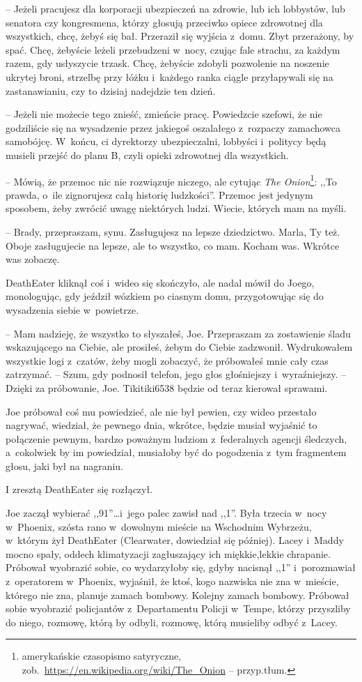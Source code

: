 \documentclass[oneside,polish,11pt,sfheadings]{mwbk}
\begin{document}
-- Jeżeli pracujesz dla korporacji ubezpieczeń na zdrowie, lub ich
lobbystów, lub senatora czy kongresmena, którzy głosują przeciwko opiece
zdrowotnej dla wszystkich, chcę, żebyś się bał. Przeraził się wyjścia z~domu. Zbyt przerażony, by spać. Chcę, żebyście leżeli przebudzeni w~nocy, czując fale strachu, za każdym razem, gdy usłyszycie trzask. Chcę,
żebyście zdobyli pozwolenie na noszenie ukrytej broni, strzelbę przy
łóżku i~każdego ranka ciągle przyłapywali się na zastanawianiu, czy to
dzisiaj nadejdzie ten dzień.

-- Jeżeli nie możecie tego znieść, zmieńcie pracę. Powiedzcie szefowi, że
nie godziliście się na wysadzenie przez jakiegoś oszalałego z~rozpaczy
zamachowca samobójcę. W~końcu, ci dyrektorzy ubezpieczalni, lobbyści i~politycy będą musieli przejść do planu B, czyli opieki zdrowotnej dla
wszystkich.

-- Mówią, że przemoc nic nie rozwiązuje niczego, ale cytując \textit{The
Onion}\footnote{ amerykańskie czasopismo satyryczne,
zob.~\url{https://en.wikipedia.org/wiki/The\_Onion} -- przyp.tłum.}: ,,To prawda, o~ile zignorujesz całą historię ludzkości''.
Przemoc jest jedynym sposobem, żeby zwrócić uwagę niektórych ludzi.
Wiecie, których mam na myśli.

-- Brady, przepraszam, synu. Zasługujesz na lepsze dziedzictwo. Marla, Ty
też. Oboje zasługujecie na lepsze, ale to wszystko, co mam. Kocham was.
Wkrótce was zobaczę.

DeathEater kliknął coś i~wideo się skończyło, ale nadal mówił do Joego,
monologując, gdy jeździł wózkiem po ciasnym domu, przygotowując się do
wysadzenia siebie w~powietrze.

-- Mam nadzieję, że wszystko to słyszałeś, Joe. Przepraszam za
zostawienie śladu wskazującego na Ciebie, ale prosiłeś, żebym do Ciebie
zadzwonił. Wydrukowałem wszystkie logi z~czatów, żeby mogli zobaczyć, że
próbowałeś mnie cały czas zatrzymać. -- Szum, gdy podnosił telefon, jego
głos głośniejszy i~wyraźniejszy. -- Dzięki za próbowanie, Joe.
Tikitiki6538 będzie od teraz kierował sprawami.

Joe próbował coś mu powiedzieć, ale nie był pewien, czy wideo przestało
nagrywać, wiedział, że pewnego dnia, wkrótce, będzie musiał wyjaśnić
to połączenie pewnym, bardzo poważnym ludziom z~federalnych agencji
śledczych, a~cokolwiek by im powiedział, musiałoby być do pogodzenia z~tym fragmentem głosu, jaki był na nagraniu.

I zresztą DeathEater się rozłączył.

Joe zaczął wybierać ,,91''\ldots  i~jego palec zawisł nad ,,1''. Była
trzecia w~nocy w~Phoenix, szósta rano w~dowolnym mieście na Wschodnim
Wybrzeżu, w~którym żył DeathEater (Clearwater, dowiedział się później).
Lacey i~Maddy mocno spały, oddech klimatyzacji zagłuszający ich
miękkie,lekkie chrapanie. Próbował wyobrazić sobie, co wydarzyłoby się,
gdyby nacisnął ,,1'' i~porozmawiał z~operatorem w~Phoenix, wyjaśnił, że
ktoś, kogo nazwiska nie zna w~mieście, którego nie zna, planuje zamach
bombowy. Kolejny zamach bombowy. Próbował sobie wyobrazić policjantów z~Departamentu Policji w~Tempe, którzy przyszliby do niego, rozmowę, którą
by odbyli, rozmowę, którą musieliby odbyć z~Lacey.
\end{document}
